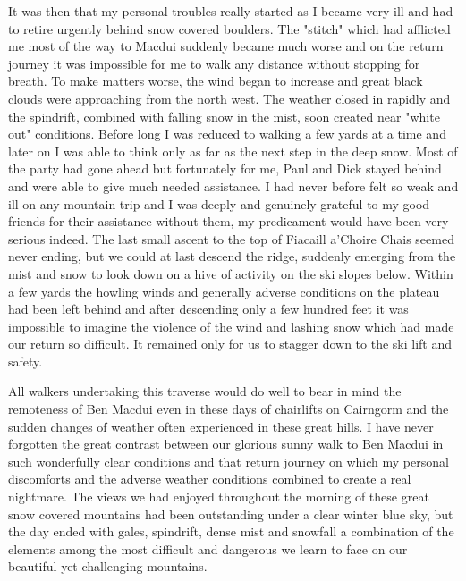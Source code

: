 \documentclass[a5paper,openany,font 10pt]{scrbook}
\begin{document}
It was then that my personal troubles really started as I
became very ill and had to retire urgently behind snow covered
boulders. The "stitch" which had afflicted me most of the way to
Macdui suddenly became much worse and on the return journey it
was impossible for me to walk any distance without stopping for
breath. To make matters worse, the wind began to increase and
great black clouds were approaching from the north west. The
weather closed in rapidly and the spindrift, combined with
falling snow in the mist, soon created near "white out"
conditions. Before long I was reduced to walking a few yards at a
time and later on I was able to think only as far as the next
step in the deep snow. Most of the party had gone ahead but
fortunately for me, Paul and Dick stayed behind and were able to
give much needed assistance. I had never before felt so weak and
ill on any mountain trip and I was deeply and genuinely grateful
to my good friends for their assistance  without them, my
predicament would have been very serious indeed. The last small
ascent to the top of Fiacaill a'Choire Chais seemed never ending,
but we could at last descend the ridge, suddenly emerging from
the mist and snow to look down on a hive of activity on the ski
slopes below. Within a few yards the howling winds and generally
adverse conditions on the plateau had been left behind and  after
descending only a few hundred feet it was impossible to imagine
the violence of the wind and lashing snow which had made our
return so difficult. It remained only for us to stagger down to
the ski lift and safety.

 All walkers undertaking this traverse would do well to bear
in mind the remoteness of Ben Macdui  even in these days of
chairlifts on Cairngorm  and the sudden changes of weather often
experienced in these great hills. I have never forgotten the
great contrast between our glorious sunny walk to Ben Macdui in
such wonderfully clear conditions and that return journey on
which my personal discomforts and the adverse weather conditions
combined to create a real nightmare. The views we had enjoyed
throughout the morning of these great snow covered mountains had
been outstanding under a clear winter blue sky, but the day ended
with gales, spindrift, dense mist and snowfall   a combination of
the elements among the most difficult and dangerous we learn to
face on our beautiful yet challenging mountains.
\end{document}
